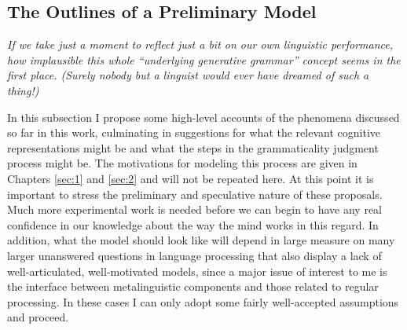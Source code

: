 \subsection{The Outlines of a Preliminary Model}\label{sec:6.2.2}
\epigraph{\itshape If we take just a moment to reflect just a bit on our own linguistic performance, how \emph{implausible} this whole ``underlying generative grammar'' concept seems in the first place. (Surely nobody but a linguist would ever have dreamed of such a thing!)\\[-2\baselineskip]}{\citep{Derwing1979}}

\noindent In this subsection I propose some high-level accounts of the phenomena discussed so far in this work, culminating in suggestions for what the relevant cognitive representations might be and what the steps in the grammaticality judgment process might be. The motivations for modeling this process are given in Chapters \ref{sec:1} and \ref{sec:2} and will not be repeated here. At this point it is important to stress the preliminary and speculative nature of these proposals. Much more experimental work is needed before we can begin to have any real confidence in our knowledge about the way the mind works in this regard. In addition, what the model should look like will depend in large measure on many larger unanswered questions in language processing that also display a lack of well-articulated, well-motivated models, since a major issue of interest to me is the interface between metalinguistic components and those related to regular processing. In these cases I can only adopt some fairly well-accepted assumptions and proceed.

